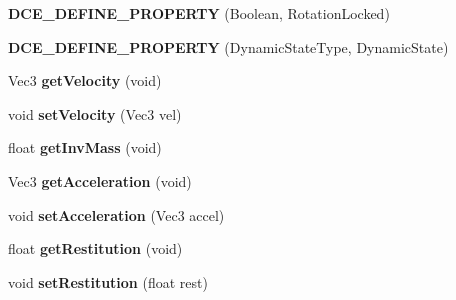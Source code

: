 \begin{DoxyCompactItemize}
\item 
\hypertarget{classDCEngine_1_1Components_1_1RigidBody_a59e74e00dd5b42b35c970486e718cd2b}{{\bfseries D\-C\-E\-\_\-\-D\-E\-F\-I\-N\-E\-\_\-\-P\-R\-O\-P\-E\-R\-T\-Y} (Boolean, Rotation\-Locked)}\label{classDCEngine_1_1Components_1_1RigidBody_a59e74e00dd5b42b35c970486e718cd2b}

\item 
\hypertarget{classDCEngine_1_1Components_1_1RigidBody_a7632cfeb32d3ea064bb765c843a73de1}{{\bfseries D\-C\-E\-\_\-\-D\-E\-F\-I\-N\-E\-\_\-\-P\-R\-O\-P\-E\-R\-T\-Y} (Dynamic\-State\-Type, Dynamic\-State)}\label{classDCEngine_1_1Components_1_1RigidBody_a7632cfeb32d3ea064bb765c843a73de1}

\item 
\hypertarget{classDCEngine_1_1Components_1_1RigidBody_a5563ec72ea77e63d870589372fb3a6dd}{Vec3 {\bfseries get\-Velocity} (void)}\label{classDCEngine_1_1Components_1_1RigidBody_a5563ec72ea77e63d870589372fb3a6dd}

\item 
\hypertarget{classDCEngine_1_1Components_1_1RigidBody_acbba9d5a58474953a9cef0d15fc0602c}{void {\bfseries set\-Velocity} (Vec3 vel)}\label{classDCEngine_1_1Components_1_1RigidBody_acbba9d5a58474953a9cef0d15fc0602c}

\item 
\hypertarget{classDCEngine_1_1Components_1_1RigidBody_afb8d6a314f80f7470105724db3f4efd7}{float {\bfseries get\-Inv\-Mass} (void)}\label{classDCEngine_1_1Components_1_1RigidBody_afb8d6a314f80f7470105724db3f4efd7}

\item 
\hypertarget{classDCEngine_1_1Components_1_1RigidBody_a964c5bfe48faf07c48cc01d4f637460a}{Vec3 {\bfseries get\-Acceleration} (void)}\label{classDCEngine_1_1Components_1_1RigidBody_a964c5bfe48faf07c48cc01d4f637460a}

\item 
\hypertarget{classDCEngine_1_1Components_1_1RigidBody_a5cfe411933623b3262c6ce922f215f2f}{void {\bfseries set\-Acceleration} (Vec3 accel)}\label{classDCEngine_1_1Components_1_1RigidBody_a5cfe411933623b3262c6ce922f215f2f}

\item 
\hypertarget{classDCEngine_1_1Components_1_1RigidBody_ae0059257098d24821a3df16b4940de7b}{float {\bfseries get\-Restitution} (void)}\label{classDCEngine_1_1Components_1_1RigidBody_ae0059257098d24821a3df16b4940de7b}

\item 
\hypertarget{classDCEngine_1_1Components_1_1RigidBody_a44497b4167f01acac5d06e44f744d908}{void {\bfseries set\-Restitution} (float rest)}\label{classDCEngine_1_1Components_1_1RigidBody_a44497b4167f01acac5d06e44f744d908}


\end{DoxyCompactItemize}
